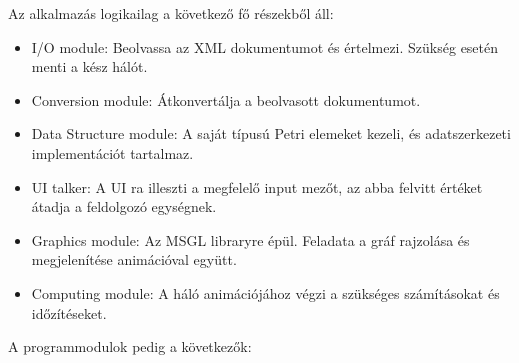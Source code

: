 Az alkalmazás logikailag a következő fő részekből áll:
\begin{itemize}
\item I/O module: Beolvassa az XML dokumentumot és értelmezi. Szükség esetén menti a kész hálót.
\item Conversion module: Átkonvertálja  a beolvasott dokumentumot.
\item Data Structure module: A saját típusú Petri elemeket kezeli, és adatszerkezeti implementációt tartalmaz. 
\item UI talker: A UI ra illeszti a megfelelő input mezőt, az abba felvitt értéket átadja a feldolgozó egységnek.
\item Graphics module: Az MSGL libraryre épül. Feladata a gráf rajzolása és megjelenítése animációval együtt. 
\item Computing module: A háló animációjához végzi a szükséges számításokat és időzítéseket. 
\end{itemize}
A programmodulok pedig a következők:
